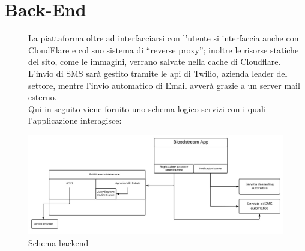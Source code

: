 \documentclass{article}
\begin{document}
\FloatBarrier

\clearpage
\section{Back-End}
\begin{description}
    \item[] La piattaforma oltre ad interfacciarsi con l’utente si interfaccia anche con CloudFlare e col suo sistema
    di “reverse proxy”; inoltre le risorse statiche del sito, come le immagini, verrano salvate nella cache di Cloudflare.
    L’invio di SMS sarà gestito tramite le api di Twilio, azienda leader del settore, mentre l'invio automatico di Email avverà grazie a un server mail esterno.
    \\ Qui in seguito viene fornito uno schema logico servizi con i quali l’applicazione interagisce:

\end{description}

\begin{figure}[htp]
    \centering
    \includegraphics[width=\textwidth,height=\textheight,keepaspectratio]{media/schema-backend.png}
    \caption{Schema backend}
\end{figure}
\end{document}
